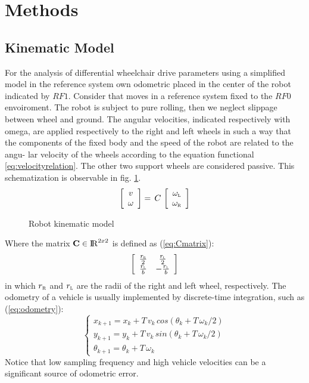 \section{Methods}
\subsection{Kinematic Model}
For the analysis of differential wheelchair drive parameters using a simplified model in the reference system own odometric placed in the center of the robot indicated by $RF1$. Consider that moves in a reference system fixed to the $RF0$ envoiroment. The robot is subject to pure rolling, then we neglect slippage between wheel and ground. The angular velocities, indicated respectively with omega, are applied respectively to the right and left wheels in such a way that the components of the fixed body and the speed of the robot are related to the angu- lar velocity of the wheels according to the equation functional \ref{eq:velocityrelation}. The other two support wheels are considered passive. This schematization is observable in fig. \ref{fig:model}.
\begin{equation}
\label{eq:velocityrelation}
	\left[ \begin{array}{cc}
				v	\\									
				\omega 							
			 \end{array} 
	\right]  =\, C\,
	\left[ \begin{array}{cc}
 				\omega_\textsc{l} \\ 
				\omega_\textsc{r}
			 \end{array} 
	\right]
\end{equation}

\begin{figure}[!h]
\centering
    \resizebox{.8\linewidth}{!}{}
\caption{Robot kinematic model}
\label{fig:model}
\end{figure}
\noindent Where the matrix $\textbf{C} \in \operatorname{\rm I\!R}^{2 x 2}$ is defined as (\ref{eq:Cmatrix}):
\begin{equation}
\label{eq:Cmatrix}
	\left[ \begin{array}{cc}
 				\frac{r_\textsc{r}}{2} &	\frac{r_\textsc{l}}{2} \\
				\frac{r_\textsc{l}}{b} &	-\frac{r_\textsc{l}}{b} 
			 \end{array} 
	\right]
\end{equation}
in which $r_\textsc{r}$ and $r_\textsc{l}$ are the radii of the right and left wheel, respectively.
The odometry of a vehicle is usually implemented by discrete-time integration, such as (\ref{eq:odometry}):
\begin{equation}
\label{eq:odometry}
	\begin{cases}
		x_{k+1} = x_{k} + T \, v_{k} \, cos(\theta_{k} + T \,\omega_{k}/2)\\
		y_{k+1} = y_{k} + T \, v_{k} \, sin(\theta_{k} + T \, \omega_{k}/2)\\
		\theta_{k+1} = \theta_{k} + T \, \omega_{k}
	\end{cases}
\end{equation}
Notice that low sampling frequency and high vehicle velocities can be a significant source of odometric error.

